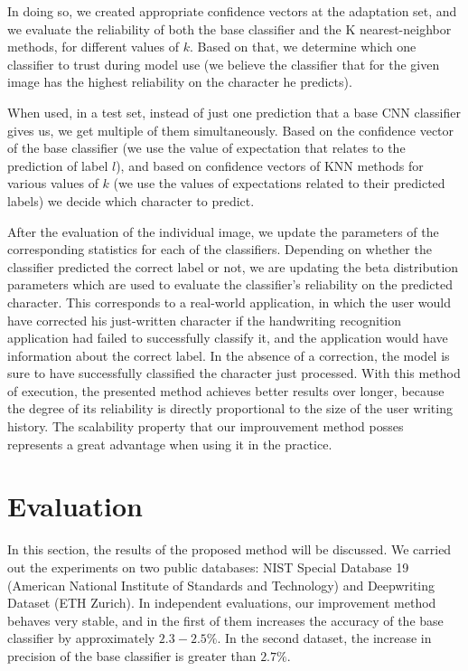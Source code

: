 \documentclass{article}
\begin{document}
In doing so, we created appropriate confidence vectors at the adaptation set, and we evaluate the reliability of both the base classifier and the K nearest-neighbor methods, for different values of $k$.
Based on that, we determine which one classifier to trust during model use (we believe the classifier that for the given image has the highest reliability on the character he predicts).

When used, in a test set, instead of just one prediction that a base CNN classifier gives us, we get multiple of them simultaneously.
Based on the confidence vector of the base classifier (we use the value of expectation that relates to the prediction of label $l$), and based on confidence vectors of KNN methods for various values of $k$
(we use the values of expectations related to their predicted labels) we decide which character to predict.

After the evaluation of the individual image, we update the parameters of the corresponding statistics for each of the classifiers.
Depending on whether the classifier predicted the correct label or not, we are updating the beta distribution parameters which are used to evaluate the classifier's reliability on the predicted character.
This corresponds to a real-world application, in which the user would have corrected his just-written character if the handwriting recognition application had failed to successfully classify it,
and the application would have information about the correct label.
In the absence of a correction, the model is sure to have successfully classified the character just processed.
With this method of execution, the presented method achieves better results over longer, because the degree of its reliability is directly proportional to the size of the user writing history.
The scalability property that our improuvement method posses represents a great advantage when using it in the practice. 

\section{Evaluation}

In this section, the results of the proposed method will be discussed.
We carried out the experiments on two public databases: NIST Special Database 19 (American National Institute of Standards and Technology) and
Deepwriting Dataset (ETH Zurich). %
In independent evaluations, our improvement method behaves very stable, and in the first of them increases the accuracy of the base classifier by approximately $2.3-2.5\%$.
In the second dataset, the increase in precision of the base classifier is greater than $2.7\%$.
\end{document}
